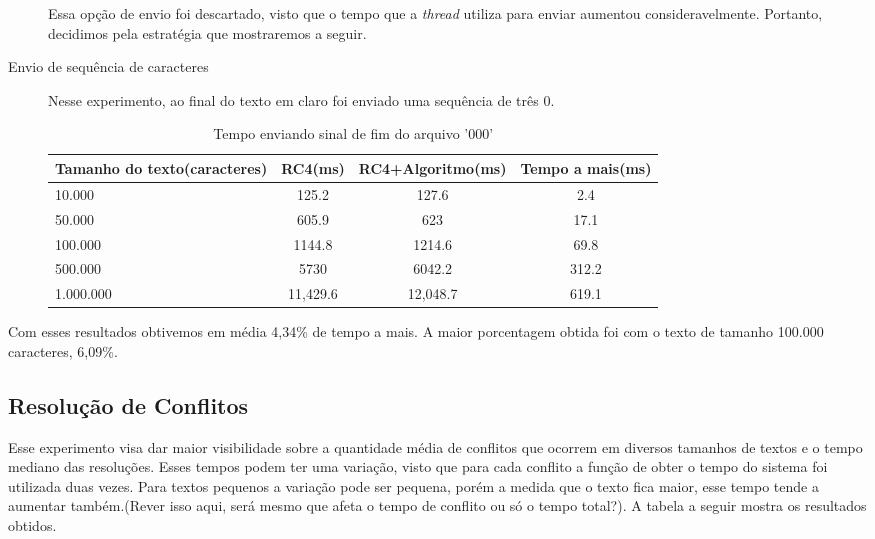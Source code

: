 \begin{description}
Essa opção de envio foi descartado, visto que o tempo que a \textit{thread} utiliza para enviar aumentou consideravelmente. Portanto, decidimos pela estratégia que mostraremos a seguir.
	
	\item[Envio de sequência de caracteres] Nesse experimento, ao final do texto em claro foi enviado uma sequência de três 0.
	
\begin{table}[h]
\centering
\begin{tabular}{|p{3cm}|c|c|c|}
\hline
Tamanho do texto(caracteres) & RC4(ms)  & RC4+Algoritmo(ms) & Tempo a mais(ms) \\ \hline
10.000                       & 125.2    & 127.6             & 2.4              \\ \hline
50.000                       & 605.9    & 623               & 17.1             \\ \hline
100.000                      & 1144.8   & 1214.6            & 69.8             \\ \hline
500.000                      & 5730     & 6042.2            & 312.2            \\ \hline
1.000.000                    & 11,429.6 & 12,048.7          & 619.1            \\ \hline
\end{tabular}
\caption{Tempo enviando sinal de fim do arquivo '000'}
\end{table}
\end{description}

Com esses resultados obtivemos em média 4,34\% de tempo a mais. A maior porcentagem obtida foi com o texto de tamanho 100.000 caracteres, 6,09\%.

\subsection{Resolução de Conflitos}

Esse experimento visa dar maior visibilidade sobre a quantidade média de conflitos que ocorrem em diversos tamanhos de textos e o tempo mediano das resoluções. Esses tempos podem ter uma variação, visto que para cada conflito a função de obter o tempo do sistema foi utilizada duas vezes. Para textos pequenos a variação pode ser pequena, porém a medida que o texto fica maior, esse tempo tende a aumentar também.(Rever isso aqui, será mesmo que afeta o tempo de conflito ou só o tempo total?). A tabela a seguir mostra os resultados obtidos.

